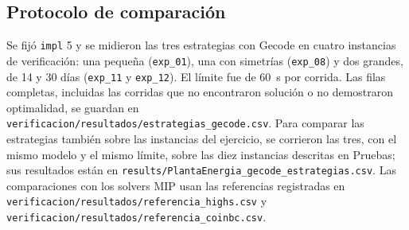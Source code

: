 \subsection{Protocolo de comparación}

Se fijó \texttt{impl} 5 y se midieron las tres estrategias con Gecode en cuatro instancias de verificación: una pequeña (\texttt{exp\_01}), una con simetrías (\texttt{exp\_08}) y dos grandes, de 14 y 30 días (\texttt{exp\_11} y \texttt{exp\_12}). El límite fue de 60~s por corrida. Las filas completas, incluidas las corridas que no encontraron solución o no demostraron optimalidad, se guardan en \texttt{verificacion/resultados/estrategias\_gecode.csv}. Para comparar las estrategias también sobre las instancias del ejercicio, se corrieron las tres, con el mismo modelo y el mismo límite, sobre las diez instancias descritas en Pruebas; sus resultados están en \texttt{results/PlantaEnergia\_gecode\_estrategias.csv}. Las comparaciones con los solvers MIP usan las referencias registradas en \texttt{verificacion/resultados/referencia\_highs.csv} y \texttt{verificacion/resultados/referencia\_coinbc.csv}.
